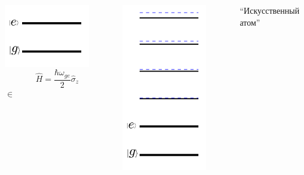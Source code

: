 \documentclass[aspectratio=169, 13pt]{beamer}
\begin{document}
\begin{frame}[c]
\begin{columns}[c]
\includegraphics[width=0.8\textwidth]{two_level_transmon}
$$
\hat{H} = \frac{\hbar \omega_{ge}}{2} \hat \sigma_z
$$
\vspace{2cm}
\vspace{-0.8cm}
$\in$


\centering
\vskip -1cm
\includegraphics[width=0.8\textwidth]{many_level_transmon}

\vspace{0.1cm}
``Искусственный атом''

\end{columns}
\end{frame}
\end{document}
